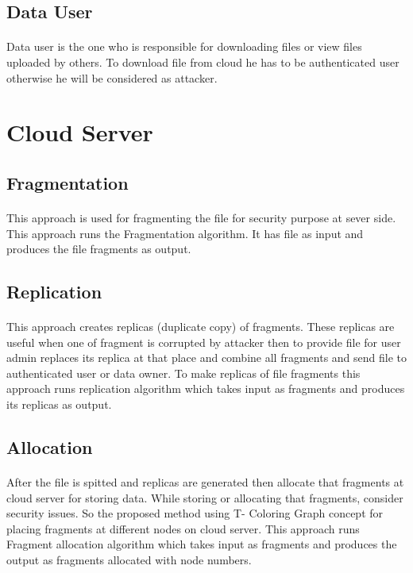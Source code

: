 \subsection{Data User}
\paragraph*{}
Data user is the one who is responsible for downloading files or view files uploaded by others. To download file from cloud he has to be authenticated user otherwise he will be considered as attacker.
\section{Cloud Server}
\subsection{Fragmentation}
\paragraph*{}
This approach is used for fragmenting the file for security purpose at sever side. This approach runs the Fragmentation algorithm. It has file as input and produces the file fragments as output.

\subsection{Replication}
\paragraph*{}
This approach creates replicas (duplicate copy) of fragments. These replicas are useful
when one of fragment is corrupted by attacker then to provide file for user admin replaces
its replica at that place and combine all fragments and send file to authenticated user or
data owner. To make replicas of file fragments this approach runs replication algorithm
which takes input as fragments and produces its replicas as output.

\subsection{Allocation}
\paragraph*{}
After the file is spitted and replicas are generated then allocate that fragments at
cloud server for storing data. While storing or allocating that fragments, consider security
issues. So the proposed method using T- Coloring Graph concept for placing fragments
at different nodes on cloud server. This approach runs Fragment allocation algorithm
which takes input as fragments and produces the output as fragments allocated with node
numbers.


